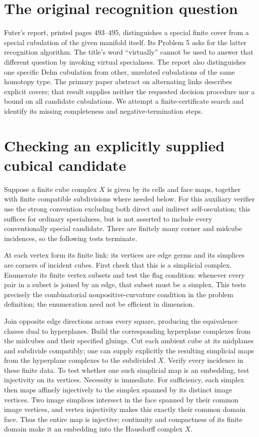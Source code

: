 \documentclass[11pt]{article}
\begin{document}
\section{The original recognition question}
Futer's report, printed pages 493--495, distinguishes a special finite
cover from a special cubulation of the given manifold itself. Its
Problem 5 asks for the latter recognition algorithm. The title's
word ``virtually'' cannot be used to answer that different question
by invoking virtual specialness. The report also distinguishes one
specific Dehn cubulation from other, unrelated cubulations of the
same homotopy type. The primary paper abstract on alternating links
describes explicit covers; that result supplies neither the requested
decision procedure nor a bound on all candidate cubulations.
We attempt a finite-certificate search and identify its missing
completeness and negative-termination steps.

\section{Checking an explicitly supplied cubical candidate}
Suppose a finite cube complex $X$ is given by its cells and face maps,
together with finite compatible subdivisions where needed below.
For this auxiliary verifier use the strong convention excluding both
direct and indirect self-osculation; this suffices for ordinary
specialness, but is not asserted to include every conventionally
special candidate. There are finitely many corner and midcube
incidences, so the following tests terminate.

At each vertex form its finite link: its vertices are edge germs and
its simplices are corners of incident cubes. First check that this
is a simplicial complex. Enumerate its finite vertex subsets and test
the flag condition: whenever every pair in a subset is joined by an
edge, that subset must be a simplex. This tests precisely the
combinatorial nonpositive-curvature condition in the problem definition;
the enumeration need not be efficient in dimension.

Join opposite edge directions across every square, producing the
equivalence classes dual to hyperplanes. Build the corresponding
hyperplane complexes from the midcubes and their specified gluings.
Cut each ambient cube at its midplanes and subdivide compatibly;
one can supply explicitly the resulting simplicial maps from the
hyperplane complexes to the subdivided $X$. Verify every incidence
in these finite data. To test whether one such simplicial map is an
embedding, test injectivity on its vertices. Necessity is immediate.
For sufficiency, each simplex then maps affinely injectively to the
simplex spanned by its distinct image vertices. Two image simplices
intersect in the face spanned by their common image vertices, and
vertex injectivity makes this exactly their common domain face.
Thus the entire map is injective; continuity and compactness of its
finite domain make it an embedding into the Hausdorff complex $X$.
\end{document}
